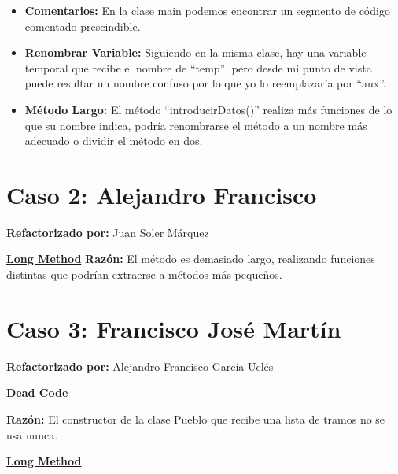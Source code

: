 \documentclass[11pt,a4paper,oneside]{book}
\begin{document}
\begin{itemize}
    \item \textbf{Comentarios: } En la clase main podemos encontrar un segmento de código comentado prescindible.
    
    
     \item \textbf{Renombrar Variable: } Siguiendo en la misma clase, hay una variable temporal que recibe el nombre de ``temp'', pero desde mi punto de vista puede resultar un nombre confuso por lo que yo lo reemplazaría por ``aux''.
     
     
      \item \textbf{Método Largo: } El método ``introducirDatos()'' realiza más funciones de lo que su nombre indica, podría renombrarse el método a un nombre más adecuado o dividir el método en dos.
          
  
\end{itemize}

\chapter{Caso 2: Alejandro Francisco}
\textbf{Refactorizado por:} Juan Soler Márquez \newline

    \hyperref[longmethod]{\textbf{Long Method}}
     \textbf{Razón:} El método es demasiado largo, realizando funciones distintas que podrían extraerse a métodos más pequeños.
    
     
 
 

\chapter {Caso 3: Francisco José Martín}
 \textbf{Refactorizado por:} Alejandro Francisco García Uclés \newline

    \hyperref[deadcode]{\textbf{Dead Code}}
    
    \textbf{Razón:} El constructor de la clase Pueblo que recibe una lista de tramos no se usa nunca.
    
    
    
    \hyperref[longmethod]{\textbf{Long Method}}
    
\end{document}
